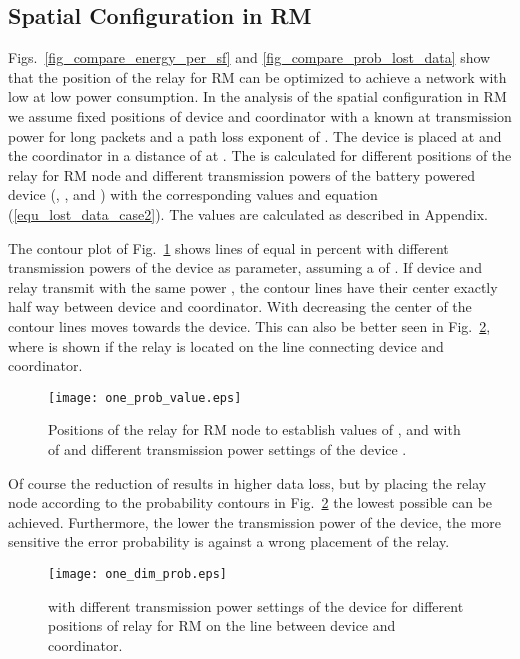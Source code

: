 \documentclass[times,10pt,twocolumn]{article}
\begin{document}
\subsection{Spatial Configuration in RM}
\label{subsection_compare_different_spatial_configurations}
Figs.~\ref{fig_compare_energy_per_sf} and \ref{fig_compare_prob_lost_data} show that the position of the relay for RM can be optimized to achieve a network with low  at low power consumption. In the analysis of the spatial configuration in RM we assume fixed positions of device and coordinator with a known  at  transmission power for  long packets and a path loss exponent of . The device is placed at  and the coordinator in a distance of  at .
The  is calculated for different positions of the relay for RM node and different transmission powers of the battery powered device  (, , and ) with the corresponding  values and equation (\ref{equ_lost_data_case2}). The  values are calculated as described in Appendix.

The contour plot of Fig.~\ref{fig_prob_loosing_packets_at_one_prob} shows lines of equal  in percent with different transmission powers of the device as parameter, assuming a  of . If device and relay transmit with the same power , the contour lines have their center exactly half way between device and coordinator. With decreasing  the center of the contour lines moves towards the device. This can also be better seen in Fig.~\ref{fig_prob_loosing_packets}, where  is shown if the relay is located on the line connecting device and coordinator.

\begin{figure}[!h]
\centering
\texttt{[image: one\_prob\_value.eps]}
\caption{Positions of the relay for RM node to establish  values of ,  and  with  of  and different transmission power settings of the device .}
    \label{fig_prob_loosing_packets_at_one_prob}
\end{figure}


Of course the reduction of  results in higher data loss, but by placing the relay node according to the probability contours in Fig.~\ref{fig_prob_loosing_packets} the lowest possible  can be achieved. Furthermore, the lower the transmission power of the device, the more sensitive the error probability is against a wrong placement of the relay.

\begin{figure}[!h]
\centering
\texttt{[image: one\_dim\_prob.eps]}
\caption{ with different transmission power settings of the device  for different positions of relay for RM on the line between device and coordinator.}
    \label{fig_prob_loosing_packets}
\end{figure}
\end{document}
